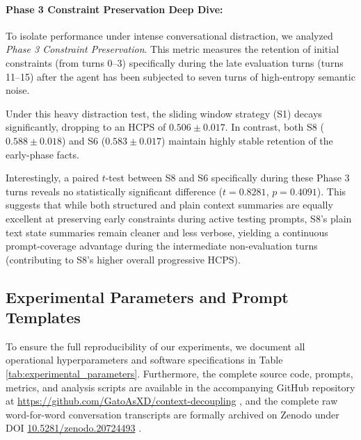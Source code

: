 \documentclass[11pt,journal,onecolumn]{article}
\begin{document}
\paragraph{Phase 3 Constraint Preservation Deep Dive:}
To isolate performance under intense conversational distraction, we analyzed \textit{Phase 3 Constraint Preservation}. This metric measures the retention of initial constraints (from turns 0--3) specifically during the late evaluation turns (turns 11--15) after the agent has been subjected to seven turns of high-entropy semantic noise. 

Under this heavy distraction test, the sliding window strategy (S1) decays significantly, dropping to an HCPS of $0.506 \pm 0.017$. In contrast, both S8 ($0.588 \pm 0.018$) and S6 ($0.583 \pm 0.017$) maintain highly stable retention of the early-phase facts. 

Interestingly, a paired $t$-test between S8 and S6 specifically during these Phase 3 turns reveals no statistically significant difference ($t = 0.8281$, $p = 0.4091$). This suggests that while both structured and plain context summaries are equally excellent at preserving early constraints during active testing prompts, S8's plain text state summaries remain cleaner and less verbose, yielding a continuous prompt-coverage advantage during the intermediate non-evaluation turns (contributing to S8's higher overall progressive HCPS).

\subsection{Experimental Parameters and Prompt Templates}
To ensure the full reproducibility of our experiments, we document all operational hyperparameters and software specifications in Table \ref{tab:experimental_parameters}. Furthermore, the complete source code, prompts, metrics, and analysis scripts are available in the accompanying GitHub repository at \url{https://github.com/GatoAsXD/context-decoupling} \cite{contextdecoupling2026}, and the complete raw word-for-word conversation transcripts are formally archived on Zenodo under DOI \href{https://doi.org/10.5281/zenodo.20724493}{10.5281/zenodo.20724493} \cite{contextdecouplingdata2026}.
\end{document}
